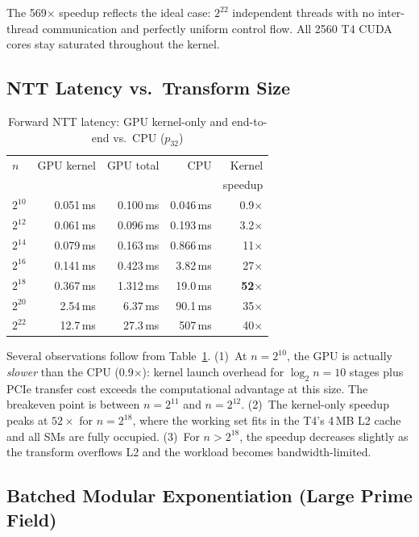 \documentclass[conference]{IEEEtran}
\begin{document}
\noindent The 569$\times$ speedup reflects the ideal case: $2^{22}$ independent threads with no
inter-thread communication and perfectly uniform control flow. All 2560 T4 CUDA cores stay
saturated throughout the kernel.

\subsection{NTT Latency vs.\ Transform Size}

\begin{table}[h]
\centering
\caption{Forward NTT latency: GPU kernel-only and end-to-end vs.\ CPU ($p_{32}$)}
\label{tab:ntt}
\begin{tabular}{lrrrr}
\toprule
$n$ & GPU kernel & GPU total & CPU & Kernel \\
 &  &  &  & speedup \\
\midrule
$2^{10}$ & 0.051\,ms & 0.100\,ms & 0.046\,ms & 0.9$\times$ \\
$2^{12}$ & 0.061\,ms & 0.096\,ms & 0.193\,ms & 3.2$\times$ \\
$2^{14}$ & 0.079\,ms & 0.163\,ms & 0.866\,ms & 11$\times$ \\
$2^{16}$ & 0.141\,ms & 0.423\,ms & 3.82\,ms & 27$\times$ \\
$2^{18}$ & 0.367\,ms & 1.312\,ms & 19.0\,ms & \textbf{52$\times$} \\
$2^{20}$ & 2.54\,ms  & 6.37\,ms  & 90.1\,ms & 35$\times$ \\
$2^{22}$ & 12.7\,ms  & 27.3\,ms  & 507\,ms  & 40$\times$ \\
\bottomrule
\end{tabular}
\end{table}

Several observations follow from Table~\ref{tab:ntt}. (1)~At $n = 2^{10}$, the GPU is actually
\emph{slower} than the CPU (0.9$\times$): kernel launch overhead for $\log_2 n = 10$ stages plus
PCIe transfer cost exceeds the computational advantage at this size. The breakeven point is between
$n = 2^{11}$ and $n = 2^{12}$. (2)~The kernel-only speedup peaks at $52\times$ for $n = 2^{18}$,
where the working set fits in the T4's 4\,MB L2 cache and all SMs are fully occupied. (3)~For
$n > 2^{18}$, the speedup decreases slightly as the transform overflows L2 and the workload becomes
bandwidth-limited.

\subsection{Batched Modular Exponentiation (Large Prime Field)}
\end{document}
